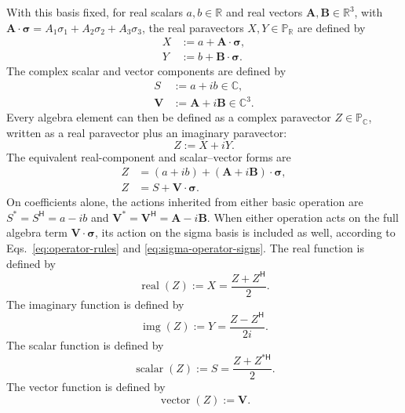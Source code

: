 \documentclass[10pt,letterpaper]{article}
\newcommand{\eqfunc}[1]{\operatorname{#1}}
\newcommand{\R}{\mathbb{R}}
\newcommand{\C}{\mathbb{C}}
\newcommand{\Pspace}{\mathbb{P}}
\newcommand{\RPspace}{\Pspace_{\R}}
\newcommand{\CPspace}{\Pspace_{\C}}
\newcommand{\pv}[1]{#1}
\newcommand{\vct}[1]{\mathbf{#1}}
\newcommand{\sigv}{\vct{\pv{\bm{\sigma}}}}
\newcommand{\Hop}{\mathsf H}
\newcommand{\herm}[1]{#1^{\Hop}}
\newcommand{\cherm}[1]{#1^{*\Hop}}
\begin{document}
With this basis fixed, for real scalars \(a,b\in\R\) and real vectors
\(\vct{A},\vct{B}\in\R^3\), with
\(\vct{A}\cdot\sigv=A_1\pv{\sigma}_1+A_2\pv{\sigma}_2+A_3\pv{\sigma}_3\),
the real paravectors \(\pv{X},\pv{Y}\in\RPspace\) are defined by
\begin{align}
\pv{X}&:=a+\vct{A}\cdot\sigv,
\label{eq:real-paravector-x}\\
\pv{Y}&:=b+\vct{B}\cdot\sigv.
\label{eq:real-paravector-y}
\end{align}
The complex scalar and vector components are defined by
\begin{align}
S&:=a+ib\in\C,
\label{eq:paravector-scalar}\\
\vct{V}&:=\vct{A}+i\vct{B}\in\C^3.
\label{eq:paravector-vector}
\end{align}
Every algebra element can then be defined as a complex paravector
\(\pv{Z}\in\CPspace\), written as a real paravector plus an imaginary
paravector:
\begin{equation}
\pv{Z}:=\pv{X}+i\pv{Y}.
\label{eq:paravector-xy}
\end{equation}
The equivalent real-component and scalar--vector forms are
\begin{align}
\pv{Z}&=(a+ib)+(\vct{A}+i\vct{B})\cdot\sigv,
\label{eq:paravector-cartesian}\\
\pv{Z}&=S+\vct{V}\cdot\sigv.
\label{eq:paravector}
\end{align}
On coefficients alone, the actions inherited from either basic operation are
\(
S^*=S^{\Hop}=a-ib
\)
and
\(
\vct{V}^*=\vct{V}^{\Hop}=\vct{A}-i\vct{B}
\).
When either operation acts on the full algebra term
\(\vct{V}\cdot\sigv\), its action on the sigma basis is included as well,
according to Eqs.\ \eqref{eq:operator-rules} and
\eqref{eq:sigma-operator-signs}.
The real function is defined by
\begin{equation}
\eqfunc{real}(\pv{Z}):=\pv{X}=\frac{\pv{Z}+\herm{\pv{Z}}}{2}.
\label{eq:real-function}
\end{equation}
The imaginary function is defined by
\begin{equation}
\eqfunc{img}(\pv{Z}):=\pv{Y}=\frac{\pv{Z}-\herm{\pv{Z}}}{2i}.
\label{eq:img-function}
\end{equation}
The scalar function is defined by
\begin{equation}
\eqfunc{scalar}(\pv{Z}):=S=\frac{\pv{Z}+\cherm{\pv{Z}}}{2}.
\label{eq:scalar-function}
\end{equation}
The vector function is defined by
\begin{equation}
\eqfunc{vector}(\pv{Z}):=\vct{V}.
\label{eq:vector-function}
\end{equation}
\end{document}
